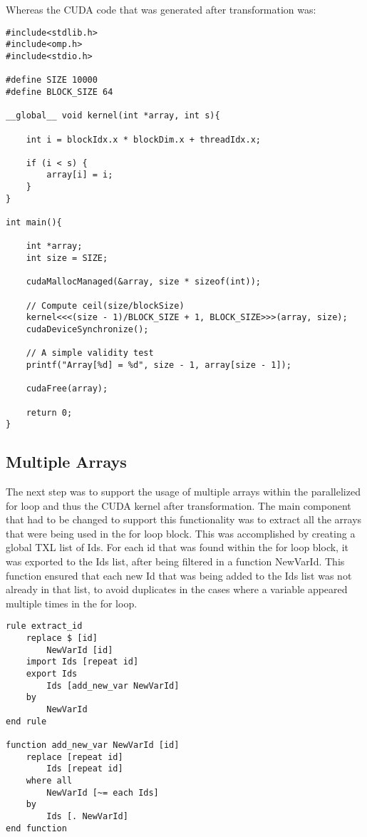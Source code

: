 \documentclass{article}
\begin{document}
Whereas the CUDA code that was generated after transformation was:

\begin{lstlisting}
#include<stdlib.h>
#include<omp.h>
#include<stdio.h>

#define SIZE 10000
#define BLOCK_SIZE 64

__global__ void kernel(int *array, int s){
	
	int i = blockIdx.x * blockDim.x + threadIdx.x;

	if (i < s) {
		array[i] = i;
	}
}

int main(){

	int *array;
	int size = SIZE;

	cudaMallocManaged(&array, size * sizeof(int));
	
	// Compute ceil(size/blockSize)
	kernel<<<(size - 1)/BLOCK_SIZE + 1, BLOCK_SIZE>>>(array, size);	
	cudaDeviceSynchronize();
	
	// A simple validity test
	printf("Array[%d] = %d", size - 1, array[size - 1]);

	cudaFree(array);

	return 0;
}
\end{lstlisting}

\subsection{Multiple Arrays}
The next step was to support the usage of multiple arrays within the parallelized for loop and thus the CUDA kernel after transformation. The main component that had to be changed to support this functionality was to extract all the arrays that were being used in the for loop block. This was accomplished by creating a global TXL list of Ids. For each id that was found within the for loop block, it was exported to the Ids list, after being filtered in a function NewVarId. This function ensured that each new Id that was being added to the Ids list was not already in that list, to avoid duplicates in the cases where a variable appeared multiple times in the for loop.

\begin{lstlisting}
rule extract_id 
    replace $ [id]
		NewVarId [id]
    import Ids [repeat id]
    export Ids
        Ids [add_new_var NewVarId]
    by
        NewVarId
end rule

function add_new_var NewVarId [id]
	replace [repeat id]
		Ids [repeat id]
	where all
		NewVarId [~= each Ids]
	by
		Ids [. NewVarId]
end function
\end{lstlisting}
\end{document}
